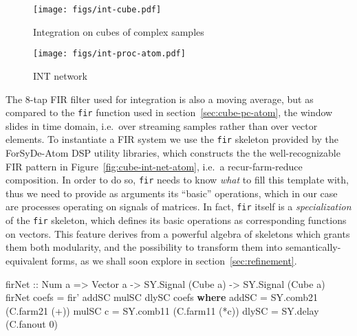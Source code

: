\documentclass[
  a4paper,
]{article}
\newenvironment{Shaded}{}{}
\newcommand{\DataTypeTok}[1]{\textcolor[rgb]{0.56,0.13,0.00}{#1}}
\newcommand{\DecValTok}[1]{\textcolor[rgb]{0.25,0.63,0.44}{#1}}
\newcommand{\FunctionTok}[1]{\textcolor[rgb]{0.02,0.16,0.49}{#1}}
\newcommand{\KeywordTok}[1]{\textcolor[rgb]{0.00,0.44,0.13}{\textbf{#1}}}
\newcommand{\NormalTok}[1]{#1}
\newcommand{\OtherTok}[1]{\textcolor[rgb]{0.00,0.44,0.13}{#1}}
\begin{document}
\begin{figure}
\hypertarget{fig:cube-int-cube-atom}{%
\centering
\texttt{[image: figs/int-cube.pdf]}
\caption{Integration on cubes of complex
samples}\label{fig:cube-int-cube-atom}
}
\end{figure}

\begin{figure}
\hypertarget{fig:cube-int-atom}{%
\centering
\texttt{[image: figs/int-proc-atom.pdf]}
\caption{INT network}\label{fig:cube-int-atom}
}
\end{figure}

The 8-tap FIR filter used for integration is also a moving average, but
as compared to the \texttt{fir} function used in
section~\ref{sec:cube-pc-atom}, the window slides in time domain,
i.e.~over streaming samples rather than over vector elements. To
instantiate a FIR system we use the \texttt{fir\textquotesingle{}}
skeleton provided by the ForSyDe-Atom DSP utility libraries, which
constructs the the well-recognizable FIR pattern in
Figure~\ref{fig:cube-int-net-atom}, i.e.~a recur-farm-reduce
composition. In order to do so, \texttt{fir\textquotesingle{}} needs to
know \emph{what} to fill this template with, thus we need to provide as
arguments its ``basic'' operations, which in our case are processes
operating on signals of matrices. In fact, \texttt{fir} itself is a
\emph{specialization} of the \texttt{fir\textquotesingle{}} skeleton,
which defines its basic operations as corresponding functions on
vectors. This feature derives from a powerful algebra of skeletons which
grants them both modularity, and the possibility to transform them into
semantically-equivalent forms, as we shall soon explore in
section~\ref{sec:refinement}.

\begin{Shaded}
\begin{Highlighting}[numbers=left,,firstnumber=564,]
\OtherTok{firNet ::} \DataTypeTok{Num}\NormalTok{ a }\OtherTok{=>} \DataTypeTok{Vector}\NormalTok{ a }\OtherTok{->} \DataTypeTok{SY.Signal}\NormalTok{ (}\DataTypeTok{Cube}\NormalTok{ a) }\OtherTok{->} \DataTypeTok{SY.Signal}\NormalTok{ (}\DataTypeTok{Cube}\NormalTok{ a)}
\NormalTok{firNet coefs }\FunctionTok{=}\NormalTok{ fir' addSC mulSC dlySC coefs}
  \KeywordTok{where}
\NormalTok{    addSC   }\FunctionTok{=}\NormalTok{ SY.comb21 (C.farm21 (}\FunctionTok{+}\NormalTok{))}
\NormalTok{    mulSC c }\FunctionTok{=}\NormalTok{ SY.comb11 (C.farm11 (}\FunctionTok{*}\NormalTok{c))}
\NormalTok{    dlySC   }\FunctionTok{=}\NormalTok{ SY.delay  (C.fanout }\DecValTok{0}\NormalTok{)}
\end{Highlighting}
\end{Shaded}
\end{document}

